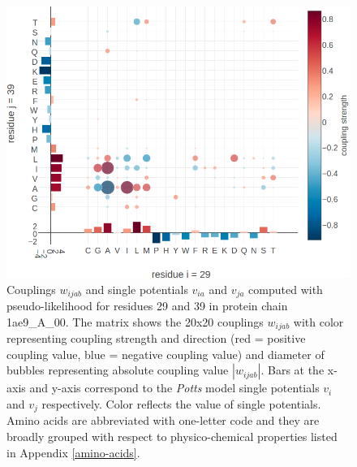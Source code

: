 \documentclass[11pt,a4paper,twoside]{book}
\newcommand{\vi}{v_{i}}
\newcommand{\vj}{v_{j}}
\newcommand{\via}{v_{ia}}
\newcommand{\vja}{v_{ja}}
\newcommand{\wijab}{w_{ijab}}
\theoremstyle{definition}
\theoremstyle{definition}
\theoremstyle{remark}
\begin{document}
\begin{figure}
\includegraphics[width=1\linewidth]{img/coupling_matrix_analysis/coupling_matrix_1ae9A00_29_39_notitle} \caption{Couplings
\(\wijab\) and single potentials \(\via\) and \(\vja\) computed with
pseudo-likelihood for residues 29 and 39 in protein chain 1ae9\_A\_00.
The matrix shows the 20x20 couplings \(\wijab\) with color representing
coupling strength and direction (red = positive coupling value, blue =
negative coupling value) and diameter of bubbles representing absolute
coupling value \(|\wijab|\). Bars at the x-axis and y-axis correspond to
the \emph{Potts} model single potentials \(\vi\) and \(\vj\)
respectively. Color reflects the value of single potentials. Amino acids
are abbreviated with one-letter code and they are broadly grouped with
respect to physico-chemical properties listed in Appendix
\ref{amino-acids}.}\label{fig:coupling-matrix-hydrophobic-interaction}
\end{figure}
\end{document}
